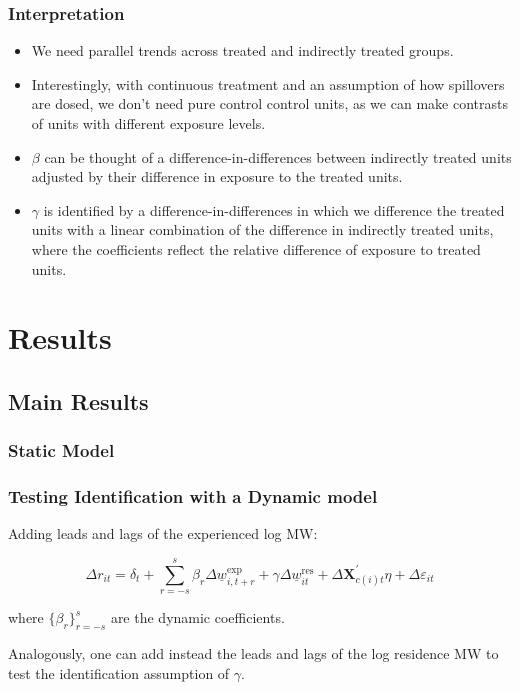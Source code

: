 \documentclass[aspectratio=169, t]{beamer}
\newcommand{\MW}{\underline{w}}
\begin{document}
\begin{frame}
\frametitle{Interpretation}

	\vspace{2mm}

	\begin{itemize}
		\vspace{2mm}\item We need parallel trends across treated and indirectly treated groups. 
		\vspace{2mm}\item Interestingly, with continuous treatment and an assumption of how spillovers are dosed, 
		we don't need pure control control units, as we can make contrasts of units with different exposure levels. 
		\vspace{2mm}\item $\beta$ can be thought of a difference-in-differences between indirectly treated units
		adjusted by their difference in exposure to the treated units. 
		\vspace{2mm}\item $\gamma$ is identified by a difference-in-differences in which we difference the treated units with a linear combination 
		of the difference in indirectly treated units, where the coefficients reflect the relative difference of exposure to treated units.
	\end{itemize}
\end{frame}

\section{Results}

\subsection{Main Results}

\begin{frame}
    \frametitle{Static Model}

    
\end{frame}

\begin{frame}[label = dyn_model]
	\frametitle{Testing Identification with a Dynamic model}
	
	Adding leads and lags of the experienced log MW:
	
	$$
	\Delta r_{it} = \delta_t
		+ \sum_{r=-s}^{s} \beta_r \Delta \MW^{\text{exp}}_{i,t+r}
		+ \gamma \Delta \MW^{\text{res}}_{it}
		+ \Delta \mathbf{X}^{'}_{c(i)t}\eta
		+ \Delta \varepsilon_{it}
    $$
	
	where $\{\beta_r\}_{r=-s}^{s}$ are the dynamic coefficients.
	
	\vspace{1mm}

    Analogously, one can add instead the leads and lags of the log residence MW
    to test the identification assumption of $\gamma$.
\end{frame}
\end{document}

